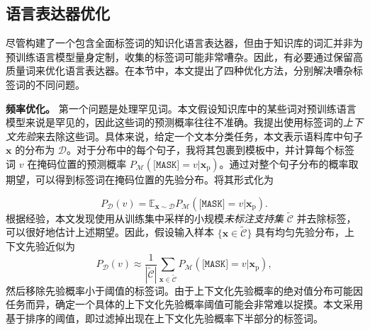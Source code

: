 \begin{table*}[!htbp]
    \centering
    \caption{扩展标签词的示例。}
    \label{tab:label_words_examples}
\end{table*}

\subsection{语言表达器优化}
\label{sec:refine}

尽管构建了一个包含全面标签词的知识化语言表达器，但由于知识库的词汇并非为预训练语言模型量身定制，收集的标签词可能非常嘈杂。因此，有必要通过保留高质量词来优化语言表达器。在本节中，本文提出了四种优化方法，分别解决嘈杂标签词的不同问题。

\textbf{频率优化。} 第一个问题是处理罕见词。本文假设知识库中的某些词对预训练语言模型来说是罕见的，因此这些词的预测概率往往不准确。我提出使用标签词的\emph{上下文先验}来去除这些词。具体来说，给定一个文本分类任务，本文表示语料库中句子 $\mathbf{x}$ 的分布为 $\mathcal{D}$。对于分布中的每个句子，我将其包裹到模板中，并计算每个标签词 $v$ 在掩码位置的预测概率 $P_{\mathcal{M}}(\texttt{[MASK]}\!\!\!=\!v|\mathbf{x}_{\text{p}})$。通过对整个句子分布的概率取期望，可以得到标签词在掩码位置的先验分布。将其形式化为

\begin{equation}
 P_{\mathcal{D}}(v)\! =\! \mathbb{E}_{\mathbf{x}\sim \mathcal{D}} P_{\mathcal{M}}(\texttt{[MASK]}\!\!\!=\!v|\mathbf{x}_{\text{p}}).
\end{equation}
根据经验，本文发现使用从训练集中采样的小规模\emph{未标注支持集} $\tilde{\mathcal{C}}$ 并去除标签，可以很好地估计上述期望。因此，假设输入样本 $\{\mathbf{x}\in \tilde{\mathcal{C}}\}$ 具有均匀先验分布，上下文先验近似为
\begin{equation}
    P_{\mathcal{D}}(v) \approx \frac{1}{|\tilde{\mathcal{C}}|} \sum_{\mathbf{x}\in \tilde{\mathcal{C}}} P_{\mathcal{M}}(\texttt{[MASK]}\!\!\!=\!v|\mathbf{x}_{\text{p}}),
\end{equation}
然后移除先验概率小于阈值的标签词。由于上下文化先验概率的绝对值分布可能因任务而异，确定一个具体的上下文化先验概率阈值可能会非常难以捉摸。本文采用基于排序的阈值，即过滤掉出现在上下文化先验概率下半部分的标签词。

